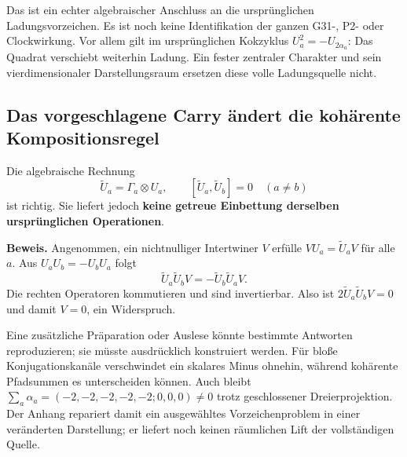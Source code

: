 Das ist ein echter algebraischer Anschluss an die ursprünglichen Ladungsvorzeichen. Es ist noch keine Identifikation der ganzen G31-, P2- oder Clockwirkung. Vor allem gilt im ursprünglichen Kokzyklus $U_a^2=-U_{2\alpha_a}$: Das Quadrat verschiebt weiterhin Ladung. Ein fester zentraler Charakter und sein vierdimensionaler Darstellungsraum ersetzen diese volle Ladungsquelle nicht.

\subsection{Das vorgeschlagene Carry ändert die kohärente Kompositionsregel}
Die algebraische Rechnung
\begin{equation}
\widetilde U_a=\Gamma_a\otimes U_a,\qquad
[\widetilde U_a,\widetilde U_b]=0\quad(a\ne b)
\end{equation}
ist richtig. Sie liefert jedoch \textbf{keine getreue Einbettung derselben ursprünglichen Operationen}.

\textbf{Beweis.} Angenommen, ein nichtnulliger Intertwiner $V$ erfülle $VU_a=\widetilde U_aV$ für alle $a$. Aus $U_aU_b=-U_bU_a$ folgt
\begin{equation}
\widetilde U_a\widetilde U_bV
=-\widetilde U_b\widetilde U_aV.
\end{equation}
Die rechten Operatoren kommutieren und sind invertierbar. Also ist $2\widetilde U_a\widetilde U_bV=0$ und damit $V=0$, ein Widerspruch.

Eine zusätzliche Präparation oder Auslese könnte bestimmte Antworten reproduzieren; sie müsste ausdrücklich konstruiert werden. Für bloße Konjugationskanäle verschwindet ein skalares Minus ohnehin, während kohärente Pfadsummen es unterscheiden können. Auch bleibt $\sum_a\alpha_a=(-2,-2,-2,-2,-2;0,0,0)\ne0$ trotz geschlossener Dreierprojektion. Der Anhang repariert damit ein ausgewähltes Vorzeichenproblem in einer veränderten Darstellung; er liefert noch keinen räumlichen Lift der vollständigen Quelle.


